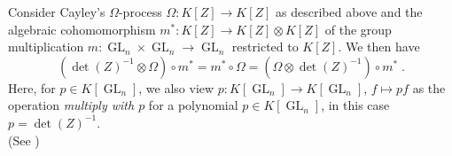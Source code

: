 \begin{lemma}
  Consider Cayley's $\Omega$-process $\Omega \colon K[Z] \rightarrow K[Z]$ as described above and the algebraic cohomomorphism $m^\ast \colon K[Z] \rightarrow K[Z] \otimes K[Z]$ of the group multiplication $m \colon \operatorname{GL}_n\times \operatorname{GL}_n \rightarrow \operatorname{GL}_n$ restricted to $K[Z]$.
  We then have
  \begin{equation*}
    \left( \operatorname{det} \left( Z \right) ^{-1} \otimes \Omega \right) \circ m^\ast
    = m^\ast \circ \Omega
    = \left( \Omega \otimes \operatorname{det} \left( Z \right) ^{-1} \right) \circ m^\ast \; .
  \end{equation*}
  Here, for $p \in K[\operatorname{GL}_n]$, we also view $ p \colon K[\operatorname{GL}_n] \rightarrow K[\operatorname{GL}_n]$, $f \mapsto pf$ as the operation \textit{multiply with $ p $} for a polynomial $ p \in K \left\lbrack \operatorname{GL}_n \right\rbrack $, in this case $p = \operatorname{det}(Z)^{-1}$.  \\
  (See \cite[4.5.22]{DK15})
\end{lemma}

